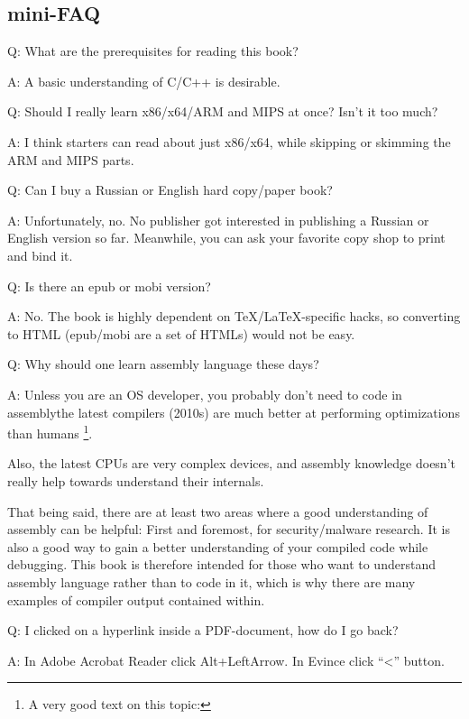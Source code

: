\subsection*{mini-FAQ}

\par Q: What are the prerequisites for reading this book?
\par A: A basic understanding of C/C++ is desirable.

\par Q: Should I really learn x86/x64/ARM and MIPS at once? Isn't it too much?
\par A: I think starters can read about just x86/x64, while skipping or skimming the ARM and MIPS parts.

\par Q: Can I buy a Russian or English hard copy/paper book?
\par A: Unfortunately, no. No publisher got interested in publishing a Russian or English version so far.
Meanwhile, you can ask your favorite copy shop to print and bind it.

\par Q: Is there an epub or mobi version?
\par A: No. The book is highly dependent on TeX/LaTeX-specific hacks, so converting to HTML (epub/mobi are a set of HTMLs)
would not be easy.

\par Q: Why should one learn assembly language these days?
\par A: Unless you are an \ac{OS} developer, you probably don't need to code in assembly\textemdash{}the latest compilers (2010s) are much better at performing optimizations than humans \footnote{A very good text on this topic: \InSqBrackets{\AgnerFog}}.

Also, the latest \ac{CPU}s are very complex devices, and assembly knowledge doesn't really help towards understand their internals.

That being said, there are at least two areas where a good understanding of assembly can be helpful:
First and foremost, for security/malware research. It is also a good way to gain a better understanding of your compiled code while debugging.
This book is therefore intended for those who want to understand assembly language rather
than to code in it, which is why there are many examples of compiler output contained within.

\par Q: I clicked on a hyperlink inside a PDF-document, how do I go back?
\par A: In Adobe Acrobat Reader click Alt+LeftArrow. In Evince click ``<'' button.

